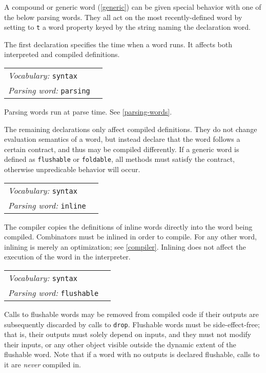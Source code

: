 \documentclass{book}
\newcommand{\vocabulary}[1]{\emph{Vocabulary:} \texttt{#1}&\\}
\newcommand{\parsingword}[2]{\index{\texttt{#1}}\emph{Parsing word:} \texttt{#2}&\\}
\newcommand{\wordtable}[1]{


\begin{tabularx}{12cm}{lX}
\hline
#1
\hline
\end{tabularx}

}
\begin{document}
A compound or generic word (\ref{generic}) can be given special behavior with one of the below parsing words. They all act on the most recently-defined word by setting to \verb|t| a word property keyed by the string naming the declaration word.

The first declaration specifies the time when a word runs. It affects both interpreted and compiled definitions.
\wordtable{
\vocabulary{syntax}
\parsingword{parsing}{parsing}
}
Parsing words run at parse time. See \ref{parsing-words}.

The remaining declarations only affect compiled definitions. They do not change evaluation semantics of a word, but instead declare that the word follows a certain contract, and thus may be compiled differently.
If a generic word is defined as \verb|flushable| or \verb|foldable|, all methods must satisfy the contract, otherwise unpredicable behavior will occur.

\wordtable{
\vocabulary{syntax}
\parsingword{inline}{inline}
}
The compiler copies the definitions of inline words directly into the word being compiled. Combinators must be inlined in order to compile. For any other word, inlining is merely an optimization; see \ref{compiler}. Inlining does not affect the execution of the word in the interpreter.

\wordtable{
\vocabulary{syntax}
\parsingword{flushable}{flushable}
}
Calls to flushable words may be removed from compiled code if their outputs are subsequently discarded by calls to \verb|drop|. Flushable words must be side-effect-free; that is, their outputs must solely depend on inputs, and they must not modify their inputs, or any other object visible outside the dynamic extent of the flushable word. Note that if a word with no outputs is declared flushable, calls to it are \emph{never} compiled in.
\end{document}
